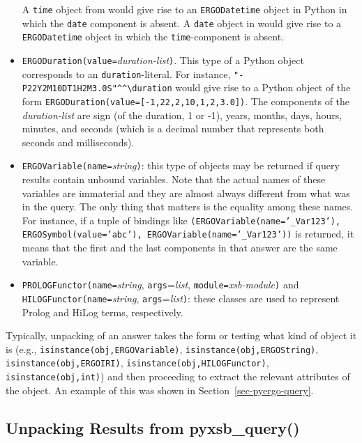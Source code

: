 \begin{itemize}
  A \texttt{\bs{}time} object from \ERGO would give rise to an
  \texttt{ERGODatetime} object in Python in which the \texttt{date}
  component is absent. A \texttt{\bs{}date} object in \ERGO would give rise
  to a \texttt{ERGODatetime} object in which the \texttt{time}-component is
  absent.
\item \texttt{ERGODuration(value=}\emph{duration-list}\texttt{)}.
  This type of a Python object corresponds to an \ERGO
  \texttt{\bs{}duration}-literal. For instance,
  \verb|"-P22Y2M10DT1H2M3.0S"^^\duration| would give rise to a Python
  object of the form
  \texttt{ERGODuration(value=[-1,22,2,10,1,2,3.0])}. The components of the
  \emph{duration-list} are sign (of the duration, 1 or -1), years, months,
  days, hours, minutes, and seconds (which is a decimal number that
  represents both seconds and milliseconds).
\item  \texttt{ERGOVariable(name=}\emph{string}\texttt{)}: this type of
  objects may be returned if query results contain unbound variables.
  Note that the actual names of these variables are immaterial and they are
  almost always different from what was in the query. The only thing that
  matters is the equality among these names. For instance, if a tuple of
  bindings like \texttt{(ERGOVariable(name='\_Var123'), ERGOSymbol(value='abc'),
    ERGOVariable(name='\_Var123'))} is returned, it means that the first and the
  last components in that answer are the same variable.
\item
  \texttt{PROLOGFunctor(name=}\emph{string}, \texttt{args}=\emph{list}, \texttt{module=}\emph{xsb-module}\texttt{)}
  and
  \\
  \texttt{HILOGFunctor(name=}\emph{string}, \texttt{args}=\emph{list}\texttt{)}:
  these classes are used to represent
  Prolog and HiLog terms, respectively.
\end{itemize}
Typically, unpacking of an answer takes the form or testing what kind of
object it is (e.g., \texttt{isinstance(obj,ERGOVariable)},
\texttt{isinstance(obj,ERGOString)},
\texttt{isinstance(obj,ERGOIRI)},
\texttt{isinstance(obj,HILOGFunctor)},
\texttt{isinstance(obj,int)})
and then proceeding to extract the relevant attributes of the object. An
example of this was shown in Section~\ref{sec-pyergo-query}.


\subsection{Unpacking Results from pyxsb\_query()}

